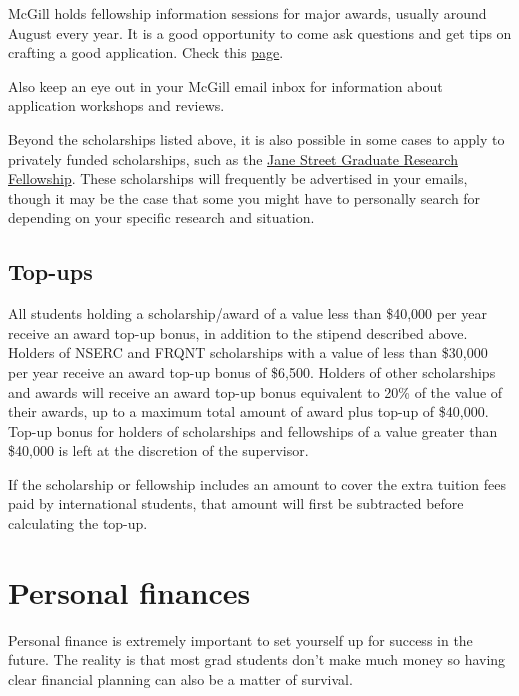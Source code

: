 \begin{plainexercise}
    McGill holds fellowship information sessions for major awards, usually around August every year. It is a good opportunity to come ask questions and get tips on crafting a good application. Check this \href{https://www.mcgill.ca/gps/funding/maximize-my-chances/workshops-information-sessions-and-webinars}{page}.
    
    Also keep an eye out in your McGill email inbox for information about application workshops and reviews.
\end{plainexercise}

Beyond the scholarships listed above, it is also possible in some cases to apply to privately funded scholarships, such as the \href{https://www.janestreet.com/join-jane-street/programs-and-events/graduate-research-fellowship/}{Jane Street Graduate Research Fellowship}. These scholarships will frequently be advertised in your emails, though it may be the case that some you might have to personally search for depending on your specific research and situation.

\subsection{Top-ups} 
All students holding a scholarship/award of a value less than \$40,000 per year receive an award top-up bonus, in addition to the stipend described above. Holders of NSERC and FRQNT scholarships with a value of less than \$30,000 per year receive an award top-up bonus of \$6,500. Holders of other scholarships and awards will receive an award top-up bonus equivalent to 20\% of the value of their awards, up to a maximum total amount of award plus top-up of \$40,000. Top-up bonus for holders of scholarships and fellowships of a value greater than \$40,000 is left at the discretion of the supervisor.

If the scholarship or fellowship includes an amount to cover the extra tuition fees paid by international students, that amount will first be subtracted before calculating the top-up.

    
    \section{Personal finances} 
Personal finance is extremely important to set yourself up for success in the future. The reality is that most grad students don't make much money so having clear financial planning can also be a matter of survival.


